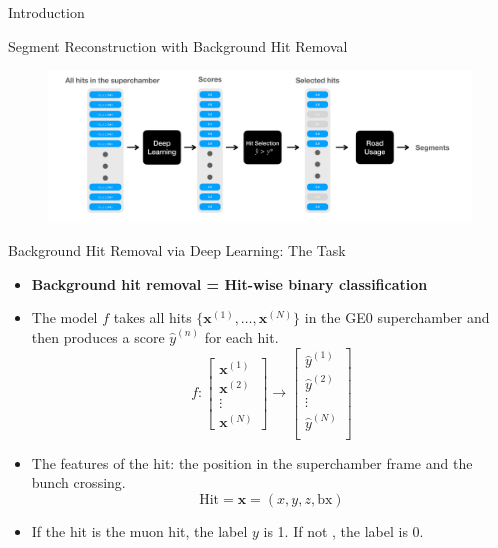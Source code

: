 \documentclass[10pt]{beamer}
\begin{document}
\begin{frame}[fragile]{Introduction}
\end{frame}

\begin{frame}[fragile]{Segment Reconstruction with Background Hit Removal}
\begin{figure}
    \centering
    \includegraphics[width=\textwidth]{figures/model/workflow.pdf}
\end{figure}
\end{frame}



\begin{frame}[fragile]{Background Hit Removal via Deep Learning: The Task}
\begin{itemize}
    \item \textbf{Background hit removal = Hit-wise binary classification}
    \item The model $f$ takes all hits $\{\mathbf{x}^{(1)}, \ldots, \mathbf{x}^{(N)}\}$ in the GE0 superchamber and then produces a score $\hat{y}^{(n)}$ for each hit.
    \begin{equation*}
        f: 
        \begin{bmatrix}
            \mathbf{x}^{(1)} \\
            \mathbf{x}^{(2)} \\
            \vdots \\
        \mathbf{x}^{(N)}
            \end{bmatrix}
        \rightarrow
        \begin{bmatrix}
            \hat{y}^{(1)} \\
            \hat{y}^{(2)} \\
            \vdots \\
            \hat{y}^{(N)} \\
        \end{bmatrix}
    \end{equation*}
    \item The features of the hit: the position in the superchamber frame and the bunch crossing.
    \begin{equation*}
        \text{Hit} = \mathbf{x} = \left( x, y, z, \text{bx} \right)
    \end{equation*}
    \item If the hit is the muon hit, the label $y$ is 1. If not , the label is 0.
\end{itemize}


\end{frame}
\end{document}
